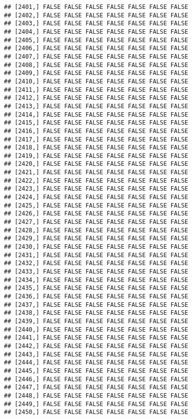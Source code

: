 \documentclass[
]{article}
\begin{document}
\begin{verbatim}
## [2401,] FALSE FALSE FALSE FALSE FALSE FALSE FALSE
## [2402,] FALSE FALSE FALSE FALSE FALSE FALSE FALSE
## [2403,] FALSE FALSE FALSE FALSE FALSE FALSE FALSE
## [2404,] FALSE FALSE FALSE FALSE FALSE FALSE FALSE
## [2405,] FALSE FALSE FALSE FALSE FALSE FALSE FALSE
## [2406,] FALSE FALSE FALSE FALSE FALSE FALSE FALSE
## [2407,] FALSE FALSE FALSE FALSE FALSE FALSE FALSE
## [2408,] FALSE FALSE FALSE FALSE FALSE FALSE FALSE
## [2409,] FALSE FALSE FALSE FALSE FALSE FALSE FALSE
## [2410,] FALSE FALSE FALSE FALSE FALSE FALSE FALSE
## [2411,] FALSE FALSE FALSE FALSE FALSE FALSE FALSE
## [2412,] FALSE FALSE FALSE FALSE FALSE FALSE FALSE
## [2413,] FALSE FALSE FALSE FALSE FALSE FALSE FALSE
## [2414,] FALSE FALSE FALSE FALSE FALSE FALSE FALSE
## [2415,] FALSE FALSE FALSE FALSE FALSE FALSE FALSE
## [2416,] FALSE FALSE FALSE FALSE FALSE FALSE FALSE
## [2417,] FALSE FALSE FALSE FALSE FALSE FALSE FALSE
## [2418,] FALSE FALSE FALSE FALSE FALSE FALSE FALSE
## [2419,] FALSE FALSE FALSE FALSE FALSE FALSE FALSE
## [2420,] FALSE FALSE FALSE FALSE FALSE FALSE FALSE
## [2421,] FALSE FALSE FALSE FALSE FALSE FALSE FALSE
## [2422,] FALSE FALSE FALSE FALSE FALSE FALSE FALSE
## [2423,] FALSE FALSE FALSE FALSE FALSE FALSE FALSE
## [2424,] FALSE FALSE FALSE FALSE FALSE FALSE FALSE
## [2425,] FALSE FALSE FALSE FALSE FALSE FALSE FALSE
## [2426,] FALSE FALSE FALSE FALSE FALSE FALSE FALSE
## [2427,] FALSE FALSE FALSE FALSE FALSE FALSE FALSE
## [2428,] FALSE FALSE FALSE FALSE FALSE FALSE FALSE
## [2429,] FALSE FALSE FALSE FALSE FALSE FALSE FALSE
## [2430,] FALSE FALSE FALSE FALSE FALSE FALSE FALSE
## [2431,] FALSE FALSE FALSE FALSE FALSE FALSE FALSE
## [2432,] FALSE FALSE FALSE FALSE FALSE FALSE FALSE
## [2433,] FALSE FALSE FALSE FALSE FALSE FALSE FALSE
## [2434,] FALSE FALSE FALSE FALSE FALSE FALSE FALSE
## [2435,] FALSE FALSE FALSE FALSE FALSE FALSE FALSE
## [2436,] FALSE FALSE FALSE FALSE FALSE FALSE FALSE
## [2437,] FALSE FALSE FALSE FALSE FALSE FALSE FALSE
## [2438,] FALSE FALSE FALSE FALSE FALSE FALSE FALSE
## [2439,] FALSE FALSE FALSE FALSE FALSE FALSE FALSE
## [2440,] FALSE FALSE FALSE FALSE FALSE FALSE FALSE
## [2441,] FALSE FALSE FALSE FALSE FALSE FALSE FALSE
## [2442,] FALSE FALSE FALSE FALSE FALSE FALSE FALSE
## [2443,] FALSE FALSE FALSE FALSE FALSE FALSE FALSE
## [2444,] FALSE FALSE FALSE FALSE FALSE FALSE FALSE
## [2445,] FALSE FALSE FALSE FALSE FALSE FALSE FALSE
## [2446,] FALSE FALSE FALSE FALSE FALSE FALSE FALSE
## [2447,] FALSE FALSE FALSE FALSE FALSE FALSE FALSE
## [2448,] FALSE FALSE FALSE FALSE FALSE FALSE FALSE
## [2449,] FALSE FALSE FALSE FALSE FALSE FALSE FALSE
## [2450,] FALSE FALSE FALSE FALSE FALSE FALSE FALSE

\end{verbatim}
\end{document}
